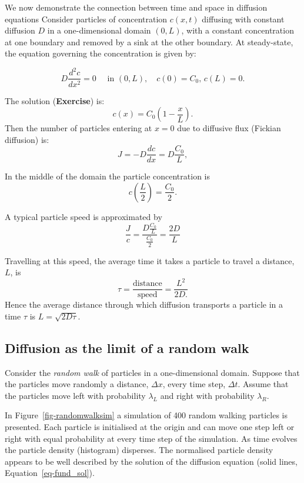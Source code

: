 \documentclass[
  letterpaper,
  DIV=11,
  numbers=noendperiod]{scrreprt}
\theoremstyle{plain}
\theoremstyle{definition}
\theoremstyle{plain}
\theoremstyle{remark}
\begin{document}
We now demonstrate the connection between time and space in diffusion
equations Consider particles of concentration \(c(x,t)\) diffusing with
constant diffusion \(D\) in a one-dimensional domain \((0,L)\), with a
constant concentration at one boundary and removed by a sink at the
other boundary. At steady-state, the equation governing the
concentration is given by:

\[
D \frac{ d^2 c}{dx^2} = 0  \quad \text{ in } (0,L), \quad c(0) = C_0, \, c(L) = 0 .
\]

The solution (\textbf{Exercise}) is: \[
c(x) = C_0 \left( 1- \frac x L\right).
\] Then the number of particles entering at \(x=0\) due to diffusive
flux (Fickian diffusion) is: \[
J = - D \frac{ dc}{ dx} = D \frac{ C_0}{L},  
\]

In the middle of the domain the particle concentration is \[
c(\frac{L}{2})=\frac{C_0}{2}.
\]

A typical particle speed is approximated by \[
 \frac{J}{c} = \frac{D \frac{ C_0}{L}}{\frac{C_0}{2}} = \frac{2D}{L}
\]

Travelling at this speed, the average time it takes a particle to travel
a distance, \(L\), is \[
\tau = \frac{\textrm{distance}}{\textrm{speed}}=\dfrac{L^2}{2D.}
\] Hence the average distance through which diffusion transports a
particle in a time \(\tau\) is \(L= \sqrt{ 2D\tau}\).

\hypertarget{diffusion-as-the-limit-of-a-random-walk}{%
\subsection{Diffusion as the limit of a random
walk}\label{diffusion-as-the-limit-of-a-random-walk}}

Consider the \emph{random walk} of particles in a one-dimensional
domain. Suppose that the particles move randomly a distance,
\(\Delta x\), every time step, \(\Delta t\). Assume that the particles
move left with probability \(\lambda_L\) and right with probability
\(\lambda_R\).

In Figure~\ref{fig-randomwalksim} a simulation of 400 random walking
particles is presented. Each particle is initialised at the origin and
can move one step left or right with equal probability at every time
step of the simulation. As time evolves the particle density (histogram)
disperses. The normalised particle density appears to be well described
by the solution of the diffusion equation (solid lines,
Equation~\ref{eq-fund_sol}).
\end{document}
